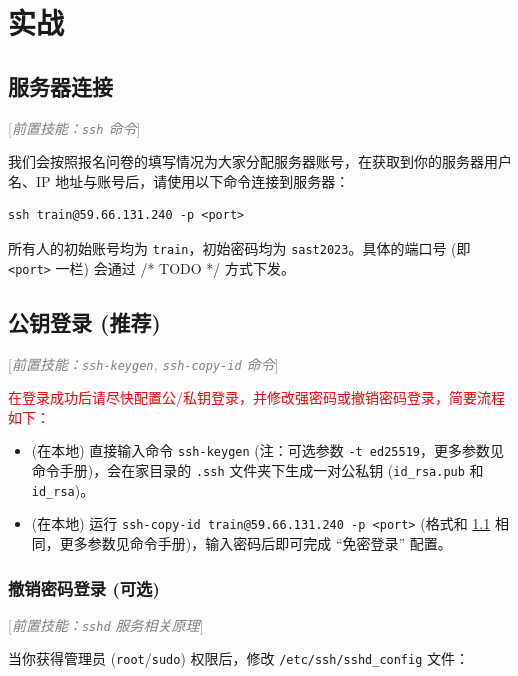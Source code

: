 \documentclass{article}
\begin{document}
	\section{实战}

	\subsection{服务器连接}
	\label{sss:connserver}

	\textcolor{gray}{[\textit{前置技能：\texttt{ssh} 命令}]}

	我们会按照报名问卷的填写情况为大家分配服务器账号，在获取到你的服务器用户名、IP 地址与账号后，请使用以下命令连接到服务器：

	\begin{verbatim}
ssh train@59.66.131.240 -p <port>
	\end{verbatim}

	所有人的初始账号均为 \texttt{train}，初始密码均为 \texttt{sast2023}。具体的端口号 (即 \texttt{<port>} 一栏) 会通过 /* TODO */ 方式下发。

	\subsection{公钥登录 (推荐)}

	\textcolor{gray}{[\textit{前置技能：\texttt{ssh-keygen}, \texttt{ssh-copy-id} 命令}]}

	\textcolor{red}{在登录成功后请尽快配置公/私钥登录，并修改强密码或撤销密码登录，简要流程如下：}

	\begin{itemize}
		\itemsep0pt
		\item (在本地) 直接输入命令 \texttt{ssh-keygen} (注：可选参数 \texttt{-t ed25519}，更多参数见命令手册)，会在家目录的 \texttt{.ssh} 文件夹下生成一对公私钥 (\verb!id_rsa.pub! 和 \verb!id_rsa!)。
		\item (在本地) 运行 \texttt{ssh-copy-id train@59.66.131.240 -p <port>} (格式和 \ref{sss:connserver} 相同，更多参数见命令手册)，输入密码后即可完成 ``免密登录'' 配置。
	\end{itemize}

	\subsubsection{撤销密码登录 (可选)}

	\textcolor{gray}{[\textit{前置技能：\texttt{sshd} 服务相关原理}]}

	当你获得管理员 (\texttt{root}/\texttt{sudo}) 权限后，修改 \verb!/etc/ssh/sshd_config! 文件：
\end{document}
